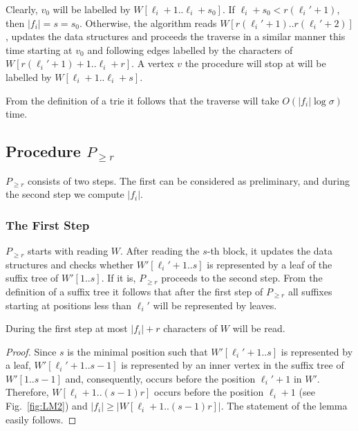 \documentclass[10pt]{llncs}
\begin{document}
Clearly, $v_0$ will be labelled by $W[\ell_i+1..\ell_i+s_0]$. If $\ell_i+s_0 < r(\ell_i'+1)$, then $|f_i| = s = s_0$. Otherwise, the algorithm reads $W[r(\ell_i'+1)..r(\ell_i'+2)]$, updates the data structures and proceeds the traverse in a similar manner this time starting at $v_0$ and following edges labelled by the characters of $W[r(\ell_i'+1)+1..\ell_i+r]$. A vertex $v$ the procedure will stop at will be labelled by $W[\ell_i+1..\ell_i+s]$.

From the definition of a trie it follows that the traverse will take $O(|f_i|\log \sigma)$ time.

\subsection{Procedure $P_{\geq r}$}
\label{sec:>r}
$P_{\geq r}$ consists of two steps. The first can be considered as preliminary, and during the second step we compute $|f_i|$. 

\subsubsection{The First Step}
$P_{\geq r}$ starts with reading $W$. After reading the $s$-th block, it updates the data structures and checks whether $W'[\ell_i'+1..s]$ is represented by a leaf of the suffix tree of $W'[1..s]$. If it is, $P_{\geq r}$ proceeds to the second step. From the definition of a suffix tree it follows that after the first step of $P_{\geq r}$ all suffixes starting at positions less than $\ell_i'$ will be represented by leaves.

\begin{lemma}
\label{lm:prelim}
During the first step at most $|f_i| + r$ characters of $W$ will be read.
\end{lemma}
\begin{proof}
Since $s$ is the minimal position such that $W'[\ell_i'+1..s]$ is represented by a leaf, $W'[\ell_i'+1..s-1]$ is represented by an inner vertex in the suffix tree of $W'[1..s-1]$ and, consequently, occurs before the position $\ell_i'+1$ in $W'$. Therefore, $W[\ell_i+1..(s-1)r]$ occurs before the position $\ell_i+1$ (see Fig.~\ref{fig:LM2}) and $|f_i| \geq |W[\ell_i+1..(s-1)r]|$. The statement of the lemma easily follows.
\end{proof}
\end{document}
